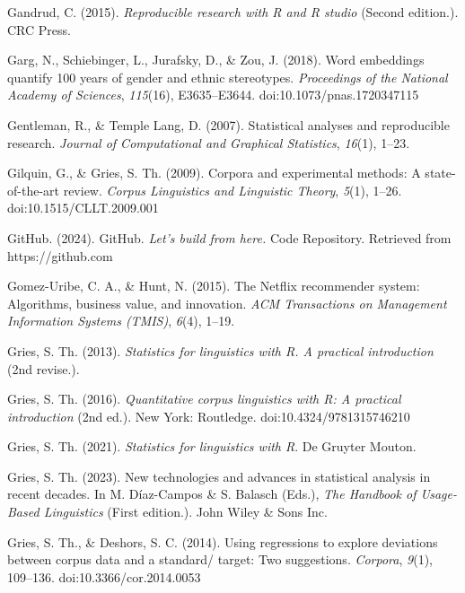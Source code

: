 \documentclass[
  letterpaper,
  krantz1]{latex/krantz-mod}
\newlength{\cslhangindent}
\newenvironment{CSLReferences}[2] %
 {\begin{list}{}{%
  \setlength{\itemindent}{0pt}
  \setlength{\leftmargin}{0pt}
  \setlength{\parsep}{0pt}
  \ifodd #1
   \setlength{\leftmargin}{\cslhangindent}
   \setlength{\itemindent}{-1\cslhangindent}
  \fi
  \setlength{\itemsep}{#2\baselineskip}}}
 {\end{list}}
\theoremstyle{definition}
\theoremstyle{definition}
\theoremstyle{remark}
\begin{document}
\begin{CSLReferences}{1}{0}
Gandrud, C. (2015). \emph{Reproducible research with {R} and {R} studio}
(Second edition.). CRC Press.

Garg, N., Schiebinger, L., Jurafsky, D., \& Zou, J. (2018). Word
embeddings quantify 100 years of gender and ethnic stereotypes.
\emph{Proceedings of the National Academy of Sciences}, \emph{115}(16),
E3635--E3644. doi:10.1073/pnas.1720347115

Gentleman, R., \& Temple Lang, D. (2007). Statistical analyses and
reproducible research. \emph{Journal of Computational and Graphical
Statistics}, \emph{16}(1), 1--23.

Gilquin, G., \& Gries, S. Th. (2009). Corpora and experimental methods:
A state-of-the-art review. \emph{Corpus Linguistics and Linguistic
Theory}, \emph{5}(1), 1--26. doi:10.1515/CLLT.2009.001

GitHub. (2024). {GitHub}. \emph{Let's build from here.} Code Repository.
Retrieved from https://github.com

Gomez-Uribe, C. A., \& Hunt, N. (2015). The {Netflix} recommender
system: {Algorithms}, business value, and innovation. \emph{ACM
Transactions on Management Information Systems (TMIS)}, \emph{6}(4),
1--19.

Gries, S. Th. (2013). \emph{Statistics for linguistics with {R}. {A}
practical introduction} (2nd revise.).

Gries, S. Th. (2016). \emph{Quantitative corpus linguistics with {R}: A
practical introduction} (2nd ed.). New York: Routledge.
doi:10.4324/9781315746210

Gries, S. Th. (2021). \emph{Statistics for linguistics with {R}}. De
Gruyter Mouton.

Gries, S. Th. (2023). New technologies and advances in statistical
analysis in recent decades. In M. Díaz-Campos \& S. Balasch (Eds.),
\emph{The {Handbook} of {Usage-Based Linguistics}} (First edition.).
John Wiley \& Sons Inc.

Gries, S. Th., \& Deshors, S. C. (2014). Using regressions to explore
deviations between corpus data and a standard/ target: Two suggestions.
\emph{Corpora}, \emph{9}(1), 109--136. doi:10.3366/cor.2014.0053


\end{CSLReferences}
\end{document}
